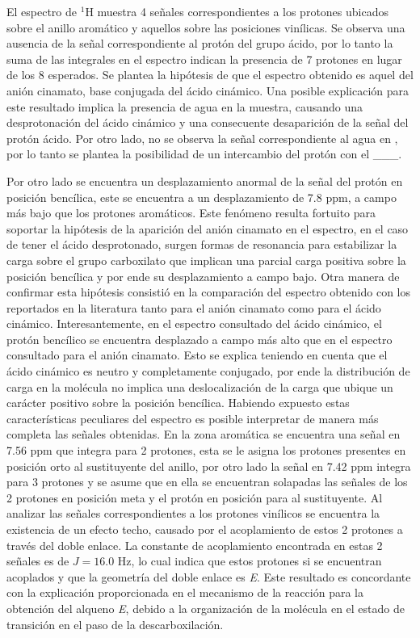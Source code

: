 \documentclass[fleqn,11pt]{SelfArx}
\begin{document}
El espectro de $^1$H muestra 4 señales correspondientes a los protones ubicados sobre el anillo aromático y aquellos sobre las posiciones vinílicas. Se observa una ausencia de la señal correspondiente al protón del grupo ácido, por lo tanto la suma de las integrales en el espectro indican la presencia de 7 protones en lugar de los 8 esperados. Se plantea la hipótesis de que el espectro obtenido es aquel del anión cinamato, base conjugada del ácido cinámico. Una posible explicación para este resultado implica la presencia de agua en la muestra, causando una desprotonación del ácido cinámico y una consecuente desaparición de la señal del protón ácido. Por otro lado, no se observa la señal correspondiente al agua en , por lo tanto se plantea la posibilidad de un intercambio del protón con el \_\_\_.

Por otro lado se encuentra un desplazamiento anormal de la señal del protón en posición bencílica, este se encuentra a un desplazamiento de 7.8 ppm, a campo más bajo que los protones aromáticos. Este fenómeno resulta fortuito para soportar la hipótesis de la aparición del anión cinamato en el espectro, en el caso de tener el ácido desprotonado, surgen formas de resonancia para estabilizar la carga sobre el grupo carboxilato que implican una parcial carga positiva sobre la posición bencílica y por ende su desplazamiento a campo bajo.
Otra manera de confirmar esta hipótesis consistió en la comparación del espectro obtenido con los reportados en la literatura tanto para el anión cinamato como para el ácido cinámico. Interesantemente, en el espectro consultado del ácido cinámico, el protón bencílico se encuentra desplazado a campo más alto que en el espectro consultado para el anión cinamato. Esto se explica teniendo en cuenta que el ácido cinámico es neutro y completamente conjugado, por ende la distribución de carga en la molécula no implica una deslocalización de la carga que ubique un carácter positivo sobre la posición bencílica.
Habiendo expuesto estas características peculiares del espectro es posible interpretar de manera más completa las señales obtenidas. En la zona aromática se encuentra una señal en 7.56 ppm que integra para 2 protones, esta se le asigna los protones presentes en posición orto al sustituyente del anillo, por otro lado la señal en 7.42 ppm integra para 3 protones y se asume que en ella se encuentran solapadas las señales de los 2 protones en posición meta y el protón en posición para al sustituyente. Al analizar las señales correspondientes a los protones vinílicos se encuentra la existencia de un efecto techo, causado por el acoplamiento de estos 2 protones a través del doble enlace. La constante de acoplamiento encontrada en estas 2 señales es de $J=16.0$ Hz, lo cual indica que estos protones si se encuentran acoplados y que la geometría del doble enlace es \textit{E}. Este resultado es concordante con la explicación proporcionada en el mecanismo de la reacción para la obtención del alqueno \textit{E}, debido a la organización de la molécula en el estado de transición en el paso de la descarboxilación.
\end{document}
